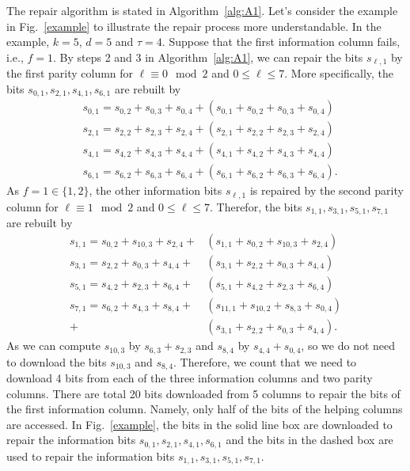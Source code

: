 \documentclass[conference]{IEEEtran}
\begin{document}
The repair algorithm is stated in Algorithm~\ref{alg:A1}.
Let's consider the example in Fig.~\ref{example} to illustrate the repair process more understandable. In the example, $k=5$, $d=5$ and $\tau=4$.
Suppose that the first information column fails, i.e., $f=1$. By steps 2 and 3 in Algorithm~\ref{alg:A1}, we can repair the bits $s_{\ell,1}$ by the first parity column for $\ell \equiv 0 \mod 2$ and $0\leq \ell\leq 7$. More specifically, the bits $s_{0,1},s_{2,1},s_{4,1},s_{6,1}$ are rebuilt by
\begin{align*}
& s_{0,1}=s_{0,2}+s_{0,3}+s_{0,4}+(s_{0,1}+s_{0,2}+s_{0,3}+s_{0,4}) \\
& s_{2,1}=s_{2,2}+s_{2,3}+s_{2,4}+(s_{2,1}+s_{2,2}+s_{2,3}+s_{2,4}) \\
& s_{4,1}=s_{4,2}+s_{4,3}+s_{4,4}+(s_{4,1}+s_{4,2}+s_{4,3}+s_{4,4}) \\
& s_{6,1}=s_{6,2}+s_{6,3}+s_{6,4}+(s_{6,1}+s_{6,2}+s_{6,3}+s_{6,4}).
\end{align*}
As $f=1\in\{1,2\}$, the other information bits $s_{\ell,1}$ is repaired by the second parity column for $\ell \equiv 1 \mod 2$ and $0\leq \ell\leq 7$. Therefor, the bits $s_{1,1},s_{3,1},s_{5,1},s_{7,1}$ are rebuilt by
\begin{align*}
s_{1,1}=s_{0,2}+s_{10,3}+s_{2,4}+&(s_{1,1}+s_{0,2}+s_{10,3}+s_{2,4}) \\
s_{3,1}=s_{2,2}+s_{0,3}+s_{4,4}+&(s_{3,1}+s_{2,2}+s_{0,3}+s_{4,4}) \\
s_{5,1}=s_{4,2}+s_{2,3}+s_{6,4}+&(s_{5,1}+s_{4,2}+s_{2,3}+s_{6,4}) \\
s_{7,1}=s_{6,2}+s_{4,3}+s_{8,4}+&(s_{11,1}+s_{10,2}+s_{8,3}+s_{0,4})\\
+&(s_{3,1}+s_{2,2}+s_{0,3}+s_{4,4}).
\end{align*}
As we can compute $s_{10,3}$ by $s_{6,3}+s_{2,3}$ and $s_{8,4}$ by $s_{4,4}+s_{0,4}$, so we do not need to download the bits $s_{10,3}$ and $s_{8,4}$.
Therefore, we count that we need to download 4 bits from each of the three information columns and two parity columns. There are total 20 bits downloaded from 5 columns to repair the bits of the first information column.
Namely, only half of the bits of the helping columns are accessed. In Fig.~\ref{example}, the bits in the solid line box are downloaded to repair the information bits $s_{0,1},s_{2,1},s_{4,1},s_{6,1}$ and the bits in the dashed box are used to repair the information bits $s_{1,1},s_{3,1},s_{5,1},s_{7,1}$.
\end{document}
